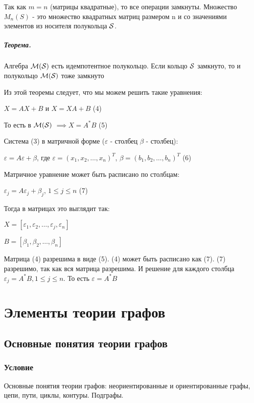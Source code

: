 \documentclass{report}
\begin{document}
\medskip

Так как $m = n$ (матрицы квадратные), то все операции замкнуты. Множество $M_n(S)$ -
это множество квадратных матриц размером n и со значениями элементов из носителя полукольца $\cal S$.

\paragraph*{Теорема.}
Алгебра $\cal M(S)$ есть идемпотентное полукольцо. Если  кольцо $\cal S$ замкнуто, то и полукольцо  $\cal M(S)$ тоже
замкнуто

\medskip

Из этой теоремы следует, что мы можем решить такие уравнения:

$X = AX + B$ и  $X = XA + B$ (4)

То есть в  $\cal M(S)$ $\implies X = A^{*}B$ (5)


\medskip

Система (3) в матричной форме ($\varepsilon$ - столбец  $\beta$ - столбец):

$\varepsilon = A\varepsilon + \beta$, где $\varepsilon = (x_1, x_2, \ldots, x_{n})^{T}$,
$\beta = (b_1,b_2,\ldots,b_{n})^{T}$ (6)


\medskip

Матричное уравнение может быть расписано по столбцам:

$\varepsilon_j = A\varepsilon_j + \beta_j$,  $1 \le j \le n$ (7)


Тогда в матрицах это выглядит так:

$X = [\varepsilon_1, \varepsilon_2, \ldots, \varepsilon_j, \varepsilon_n]$

$B = [\beta_1, \beta_2, \ldots, \beta_{n}]$

\medskip

Матрица (4) разрешима в виде (5). (4) может быть расписано как (7). (7) разрешимо, так как
вся матрица разрешима. И решение для каждого столбца $\varepsilon_{j} = A^{*}B, 1\le j\le n$. То есть
$\varepsilon = A^{*}B$

\newpage

\chapter{Элементы теории графов}
\section{Основные понятия теории графов}
\subsection{Условие}
Основные понятия теории графов: неориентированные и ориентированные графы,
цепи, пути, циклы, контуры. Подграфы.
\end{document}
